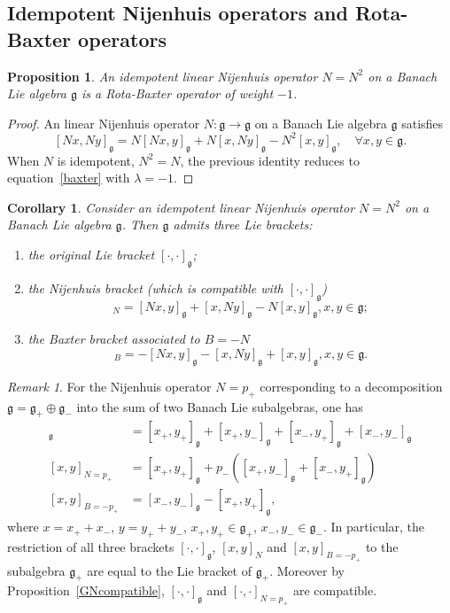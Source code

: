 \documentclass[a4paper,12pt,reqno]{amsart}%
\newtheorem{proposition}[theorem]{Proposition}
\newtheorem{corollary}[theorem]{Corollary}
\theoremstyle{definition}
\theoremstyle{remark}
\newtheorem{remark}[theorem]{Remark}
\numberwithin{theorem}{section}
\numberwithin{equation}{section}
\newcommand{\1}{{\bf 1}}
\newcommand{\g}{{\mathfrak g}}
\begin{document}
\subsection{Idempotent Nijenhuis operators and Rota-Baxter operators}


\begin{proposition}
    An idempotent linear Nijenhuis operator $N = N^2$ on a Banach Lie algebra $\g$ is a Rota-Baxter operator of weight $-1$. 
\end{proposition}
\begin{proof}
    An linear Nijenhuis operator $N:\g\rightarrow\g$ on a Banach Lie algebra $\g$ satisfies
    \[
      [Nx, Ny]_\g = N[Nx, y]_\g + N[x, Ny]_\g - N^2[x, y]_\g, \quad \forall x, y \in \g.
    \]
    When $N$ is idempotent, $N^2 = N$, the previous identity reduces to equation~\eqref{baxter} with $\lambda = -1$.
\end{proof}
\begin{corollary}
    Consider an idempotent linear Nijenhuis operator $N = N^2$ on a Banach Lie algebra $\g$. Then $\g$ admits three Lie brackets:
    \begin{enumerate}
        \item the original Lie bracket $[\cdot, \cdot]_\g$;
        \item the Nijenhuis bracket (which is compatible with $[\cdot,\cdot]_\g$)
        \begin{equation}
             [x, y]_N = [Nx, y]_\g + [x, Ny]_\g - N [x, y]_\g, x, y \in \g;
         \end{equation}
        \item the Baxter bracket associated to $B = -N$
        \begin{equation}
         [x, y]_B = -[Nx, y]_\g - [x, Ny]_\g + [x,y]_\g, x, y \in \g.
        \end{equation}
    \end{enumerate}
\end{corollary}


\begin{remark}
    For the Nijenhuis operator $N = p_+$ corresponding to a decomposition $\g =\g_+ \oplus \g_-$ into the sum of two Banach Lie subalgebras, one has
   \begin{align}
    [x, y]_\g  &= [x_+, y_+]_\g  + [x_+, y_-]_\g  + [x_-, y_+]_\g  + [x_-, y_-]_\g  \\
    [x,  y]_{N = p_+} &= [x_+, y_+]_\g  +  p_-\left([x_+, y_-]_\g  + [x_-, y_+]_\g \right) \\
    [x, y]_{B = -p_+} &=   [x_-, y_-]_\g  - [x_+, y_+]_\g ,
    \end{align}
    where $x = x_+ + x_-$, $y = y_+ + y_-$, $x_+, y_+\in \g_+$, $x_-, y_-\in \g_-$.
    In particular, the restriction of all three brackets $[\cdot, \cdot]_\g $, $[x, y]_N$ and $[x, y]_{B = -p_+}$ to the subalgebra $\g_+$ are equal to the Lie bracket of $\g_+$. Moreover by Proposition~\ref{GNcompatible}, $[\cdot,\cdot]_\g $ and $[\cdot, \cdot]_{N = p_+}$ are compatible.
\end{remark}
\end{document}
